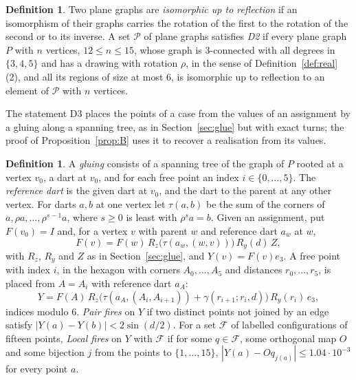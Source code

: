 \documentclass[12pt]{amsart}
\theoremstyle{definition}
\newtheorem{definition}[theorem]{Definition}
\theoremstyle{plain}
\theoremstyle{definition}
\newcommand{\leanmap}[1]{\ignorespaces}
\newcommand{\mapnote}[1]{\ignorespaces}
\begin{document}
\begin{definition}\label{def:dtwo}\leanmap{Tammes15.EnumComplete, Tammes15.D2Regions.PlaneClass, Tammes15.D2Regions.IsArcDrawing, Tammes15.D2Regions.minorArc, Tammes15.D2Regions.dartArc, Tammes15.D2Regions.drawingSet, Tammes15.D2Regions.IsRegion, Tammes15.D2Regions.Bounds, Tammes15.D2Regions.regionSize, Tammes15.IsAngular, Tammes15.RotSys.IsoRefl}\mapnote{the rotation of the drawing as \texttt{Tammes15.IsAngular}, the condition of Definition \ref{def:real}(2)}
Two plane graphs are \emph{isomorphic up to reflection} if an isomorphism of their graphs carries the rotation of the first to the rotation of the second or to its inverse. A set $\mathcal P$ of plane graphs satisfies \emph{D2} if every plane graph $P$ with $n$ vertices, $12\le n\le15$, whose graph is 3-connected with all degrees in $\{3,4,5\}$ and has a drawing with rotation $\rho$, in the sense of Definition~\ref{def:real}(2), and all its regions of size at most $6$, is isomorphic up to reflection to an element of $\mathcal P$ with $n$ vertices.
\end{definition}

The statement D3 places the points of a case from the values of an assignment by a gluing along a spanning tree, as in Section~\ref{sec:glue} but with exact turns; the proof of Proposition~\ref{prop:B} uses it to recover a realisation from its values.

\begin{definition}\label{def:glue}\leanmap{Tammes15.GlueData, Tammes15.GlueData.Valid, Tammes15.GlueData.refD, Tammes15.turnSteps, Tammes15.Assign.turn, Tammes15.GlueData.frame, Tammes15.glueY, Tammes15.stepM, Tammes15.PairFires, Tammes15.LocalFires, Tammes15.rLocal}
A \emph{gluing} consists of a spanning tree of the graph of $P$ rooted at a vertex $v_0$, a dart at $v_0$, and for each free point an index $i\in\{0,\dots,5\}$. The \emph{reference dart} is the given dart at $v_0$, and the dart to the parent at any other vertex. For darts $a,b$ at one vertex let $\tau(a,b)$ be the sum of the corners of $a,\rho a,\dots,\rho^{s-1}a$, where $s\ge0$ is least with $\rho^sa=b$. Given an assignment, put $F(v_0)=I$ and, for a vertex $v$ with parent $w$ and reference dart $a_w$ at $w$,
\[
F(v)=F(w)\,R_z\bigl(\tau(a_w,(w,v))\bigr)\,R_y(d)\,Z ,
\]
with $R_z$, $R_y$ and $Z$ as in Section~\ref{sec:glue}, and $Y(v)=F(v)e_3$. A free point with index $i$, in the hexagon with corners $A_0,\dots,A_5$ and distances $r_0,\dots,r_5$, is placed from $A=A_i$ with reference dart $a_A$:
\[
Y=F(A)\,R_z\bigl(\tau(a_A,(A_i,A_{i+1}))+\gamma(r_{i+1};r_i,d)\bigr)\,R_y(r_i)\,e_3 ,
\]
indices modulo $6$. \emph{Pair fires} on $Y$ if two distinct points not joined by an edge satisfy $|Y(a)-Y(b)|<2\sin(d/2)$. For a set $\mathcal F$ of labelled configurations of fifteen points, \emph{Local fires} on $Y$ with $\mathcal F$ if for some $q\in\mathcal F$, some orthogonal map $O$ and some bijection $j$ from the points to $\{1,\dots,15\}$, $|Y(a)-Oq_{j(a)}|\le1.04\cdot10^{-3}$ for every point $a$.
\end{definition}
\end{document}
